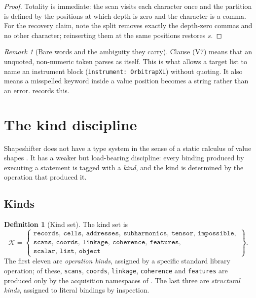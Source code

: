 \documentclass[11pt,twocolumn,a4paper]{article}
\theoremstyle{ssthm}
\theoremstyle{definition}
\newtheorem{definition}[theorem]{Definition}
\theoremstyle{remark}
\newtheorem{remark}[theorem]{Remark}
\newcommand{\shk}[1]{\texttt{#1}}
\newcommand{\Kset}{\mathcal{K}}
\begin{document}
\begin{proof}
Totality is immediate: the scan visits each character once and the
partition is defined by the positions at which depth is zero and the
character is a comma. For the recovery claim, note the split removes
exactly the depth-zero commas and no other character; reinserting them at
the same positions restores $s$.
\end{proof}

\begin{remark}[Bare words and the ambiguity they carry]
\label{rem:bareword}
Clause (V7) means that an unquoted, non-numeric token parses as itself.
This is what allows a target list to name an instrument block
(\shk{instrument: OrbitrapXL}) without quoting. It also means a
misspelled keyword inside a value position becomes a string rather than
an error.  records this.
\end{remark}

\section{The kind discipline}
\label{sec:kinds}

Shapeshifter does not have a type system in the sense of a static
calculus of value shapes \citep{pierce2002types,cardelli1985understanding}.
It has a weaker but load-bearing discipline: every binding produced by
executing a statement is tagged with a \emph{kind}, and the kind is
determined by the operation that produced it.

\subsection{Kinds}

\begin{definition}[Kind set]
\label{def:kinds}
The kind set is
\[
\Kset=\left\{
\begin{array}{l}
\shk{records},\ \shk{cells},\ \shk{addresses},\ \shk{subharmonics},\
\shk{tensor},\ \shk{impossible},\\
\shk{scans},\ \shk{coords},\ \shk{linkage},\ \shk{coherence},\
\shk{features},\\
\shk{scalar},\ \shk{list},\ \shk{object}
\end{array}
\right\}.
\]
The first eleven are \emph{operation kinds}, assigned by a specific
standard library operation; of these, \shk{scans}, \shk{coords},
\shk{linkage}, \shk{coherence} and \shk{features} are produced only by
the acquisition namespaces of \Cref{sec:acquisition}. The last three are
\emph{structural kinds}, assigned to literal bindings by inspection.
\end{definition}
\end{document}
